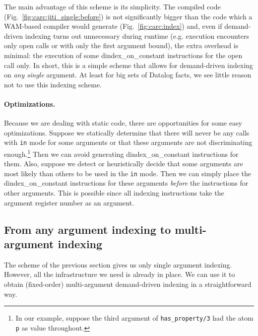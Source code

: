 \documentclass{llncs}
\newcommand{\code}[1]{\texttt{#1}}
\newcommand{\instr}[1]{\textsf{#1}}
\newcommand{\jitiONconstant}{\mbox{\instr{dindex\_on\_constant}}\xspace}
\newcommand{\JITI}{demand-driven indexing\xspace}
\begin{document}
The main advantage of this scheme is its simplicity. The compiled code
(Fig.~\ref{fig:carc:jiti_single:before}) is not significantly bigger
than the code which a WAM-based compiler would generate
(Fig.~\ref{fig:carc:index}) and, even if \JITI turns out unnecessary
during runtime (e.g. execution encounters only open calls or with only
the first argument bound), the extra overhead is minimal: the
execution of some \jitiONconstant instructions for the open call only.
%
In short, this is a simple scheme that allows for \JITI on \emph{any
single} argument. At least for big sets of Datalog facts, we see
little reason not to use this indexing scheme.

\paragraph*{Optimizations.}
Because we are dealing with static code, there are opportunities for
some easy optimizations. Suppose we statically determine that there
will never be any calls with \code{in} mode for some arguments or that
these arguments are not discriminating enough.\footnote{In our example,
suppose the third argument of \code{has\_property/3} had the atom
\code{p} as value throughout.} Then we can avoid generating
\jitiONconstant instructions for them. Also, suppose we detect or
heuristically decide that some arguments are most likely than others
to be used in the \code{in} mode. Then we can simply place the
\jitiONconstant instructions for these arguments \emph{before} the
instructions for other arguments. This is possible since all indexing
instructions take the argument register number as an argument.

\subsection{From any argument indexing to multi-argument indexing}
The scheme of the previous section gives us only single argument
indexing. However, all the infrastructure we need is already in place.
We can use it to obtain (fixed-order) multi-argument \JITI in a
straightforward way.
\end{document}
